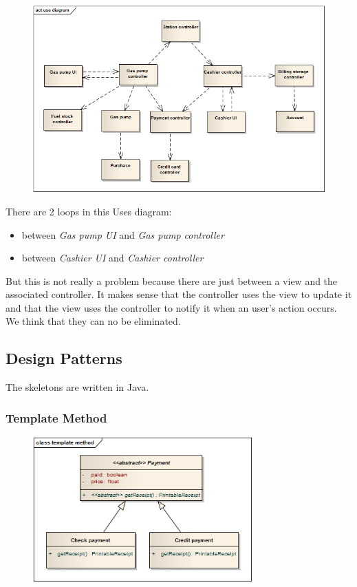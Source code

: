 \begin{figure}[H]
 \centering
 \includegraphics[width=\textwidth]{../useDiagram.png}
\end{figure}
There are 2 loops in this Uses diagram:
\begin{itemize}
	\item between \textit{Gas pump UI} and \textit{Gas pump controller}
	\item between \textit{Cashier UI} and \textit{Cashier controller}
\end{itemize}
But this is not really a problem because there are just between a view and the associated controller. It makes sense that the controller uses the view to update it and that the view uses the controller to notify it when an user's action occurs. We think that they can no be eliminated.


\subsection{Design Patterns}
The skeletons are written in Java.

\subsubsection{Template Method}
\begin{figure}[H]
 \centering
 \includegraphics[width=0.75\textwidth]{../templateMethod.png}
\end{figure}

